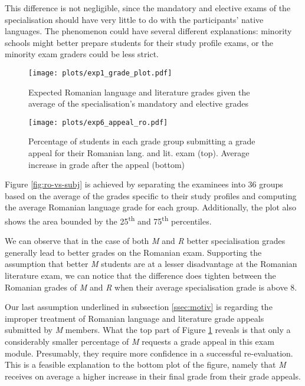 This difference is not negligible, since the mandatory and elective exams of the specialisation should have very little to do with the participants' native languages. The phenomenon could have several different explanations: minority schools might better prepare students for their study profile exams, or the minority exam graders could be less strict.


\begin{figure}
    \centering
    \begin{minipage}[t]{0.49\textwidth}
        \texttt{[image: plots/exp1\_grade\_plot.pdf]}
        \caption{Expected Romanian language and literature grades given the average of the specialisation's mandatory and elective grades}
        \label{fig:ro-vs-subj}
    \end{minipage}
    \hfill
    \begin{minipage}[t]{0.49\textwidth}
        \texttt{[image: plots/exp6\_appeal\_ro.pdf]}
        \caption{Percentage of students in each grade group submitting a grade appeal for their Romanian lang. and lit. exam (top). Average increase in grade after the appeal (bottom)}
        \label{fig:appeal}
    \end{minipage}
\end{figure}



Figure \ref{fig:ro-vs-subj} is achieved by separating the examinees into 36 groups based on the average of the grades specific to their study profiles and computing the average Romanian language grade for each group. Additionally, the plot also shows the area bounded by the 25\textsuperscript{th} and 75\textsuperscript{th} percentiles.

We can observe that in the case of both \textit{M} and \textit{R} better specialisation grades generally lead to better grades on the Romanian exam. Supporting the assumption that better \textit{M} students are at a lesser disadvantage at the Romanian literature exam, we can notice that the difference does tighten between the Romanian grades of \textit{M} and \textit{R} when their average specialisation grade is above 8.




Our last assumption underlined in subsection \ref{ssec:motiv} is regarding the improper treatment of Romanian language and literature grade appeals submitted by \textit{M} members. What the top part of Figure \ref{fig:appeal} reveals is that only a considerably smaller percentage of \textit{M} requests a grade appeal in this exam module. Presumably, they require more confidence in a successful re-evaluation. This is a feasible explanation to the bottom plot of the figure, namely that \textit{M} receives on average a higher increase in their final grade from their grade appeals.




